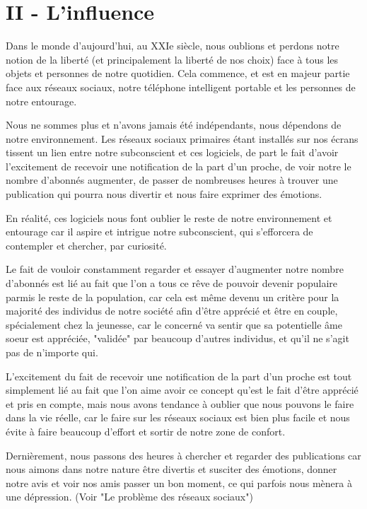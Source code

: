\documentclass[]{liberty}
\begin{document}
\section*{II - L'influence}
Dans le monde d'aujourd'hui, au XXIe siècle, nous oublions et perdons notre notion de la 
liberté (et principalement la liberté de nos choix) face à tous les objets et personnes de notre 
quotidien. Cela commence, et est en majeur partie face aux réseaux sociaux, notre téléphone 
intelligent portable et les personnes de notre entourage.\newline 

Nous ne sommes plus et n'avons jamais été indépendants, nous dépendons de notre environnement.
Les réseaux sociaux primaires étant installés sur nos écrans tissent un lien entre notre 
subconscient et ces logiciels, de part le fait d'avoir l'excitement de recevoir une 
notification de la part d'un proche, de voir notre le nombre d'abonnés augmenter, de passer de 
nombreuses heures à trouver une publication qui pourra nous divertir et nous faire exprimer
des émotions.\newline  

En réalité, ces logiciels nous font oublier le reste de notre environnement et entourage car il 
aspire et intrigue notre subconscient, qui s'efforcera de contempler et chercher, par curiosité.
\newline

Le fait de vouloir constamment regarder et essayer d'augmenter notre nombre d'abonnés est lié au
fait que l'on a tous ce rêve de pouvoir devenir populaire parmis le reste de la population, car cela 
est même devenu un critère pour la majorité des individus de notre société afin d'être apprécié et être 
en couple, spécialement chez la jeunesse, car le concerné va sentir que sa potentielle âme soeur
est appréciée, "validée" par beaucoup d'autres individus, et qu'il ne s'agit pas de n'importe qui.\newline

L'excitement du fait de recevoir une notification de la part d'un proche est tout simplement lié 
au fait que l'on aime avoir ce concept qu'est le fait d'être apprécié et pris en compte, mais nous 
avons tendance à oublier que nous pouvons le faire dans la vie réelle, car le faire sur les 
réseaux sociaux est bien plus facile et nous évite à faire beaucoup d'effort et sortir de notre 
zone de confort.\newline 

Dernièrement, nous passons des heures à chercher et regarder des publications 
car nous aimons dans notre nature être divertis et susciter des émotions, donner notre avis et voir 
nos amis passer un bon moment, ce qui parfois nous mènera à une dépression. (Voir "Le problème 
des réseaux sociaux")\newline 
\end{document}
